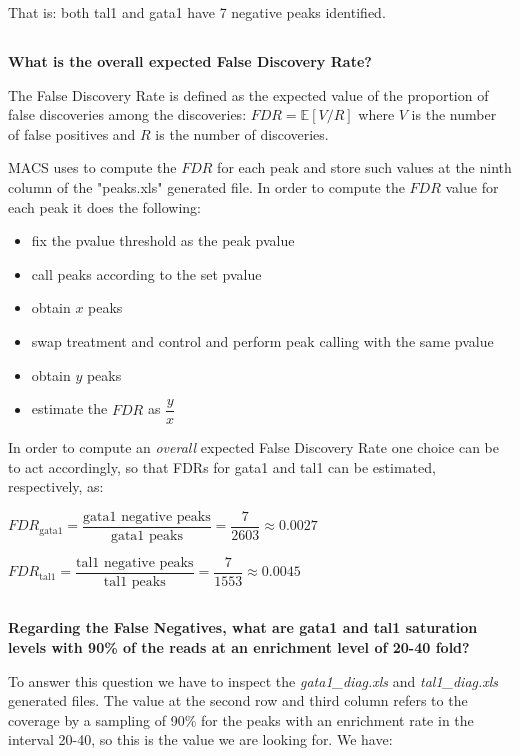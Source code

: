\documentclass[12pt, a4paper]{article}
\begin{document}
	That is: both tal1 and gata1 have 7 negative peaks identified.
	
	\subsection{}
	\textbf{What is the overall expected False Discovery Rate?}
	
	The False Discovery Rate is defined as the expected value of the proportion of false discoveries among the discoveries: $ FDR = \mathbb{E}[ V / R ]$ where $V$ is the number of false positives and $R$ is the number of discoveries.
	
	MACS uses to compute the $FDR$ for each peak and store such values at the ninth column of the "peaks.xls" generated file. In order to compute the $FDR$ value for each peak it does the following:
	
	\begin{itemize}
		\item fix the pvalue threshold as the peak pvalue
		\item call peaks according to the set pvalue
		\item obtain $x$ peaks
		\item swap treatment and control and perform peak calling with the same pvalue
		\item obtain $y$ peaks
		\item estimate the $FDR$ as $\dfrac{y}{x}$
	\end{itemize}
	
	In order to compute an \textit{overall} expected False Discovery Rate one choice can be to act accordingly, so that FDRs for gata1 and tal1 can be estimated, respectively, as:
	
	$FDR_\text{gata1} = \dfrac{\text{gata1 negative peaks}}{\text{gata1 peaks}} = \dfrac{7}{2603} \approx{0.0027}$
	
	
	$FDR_\text{tal1} = \dfrac{\text{tal1 negative peaks}}{\text{tal1 peaks}} = \dfrac{7}{1553} \approx{0.0045}$
	
	\subsection{}
	\textbf{Regarding the False Negatives, what are gata1 and tal1 saturation levels with 90\% of the reads at an enrichment level of 20-40 fold?}
	
	To answer this question we have to inspect the \textit{gata1\_diag.xls } and \textit{tal1\_diag.xls} generated files. The value at the second row and third column refers to the coverage by a sampling of 90\% for the peaks with an enrichment rate in the interval 20-40, so this is the value we are looking for. We have:\\
	
\end{document}
